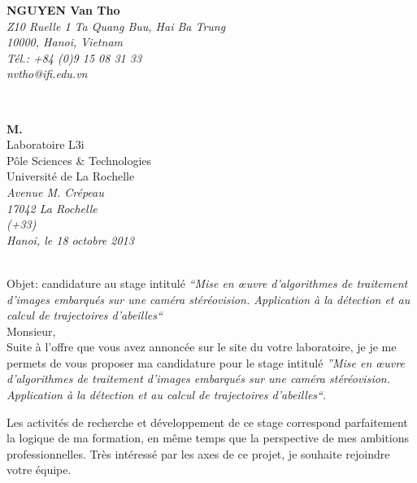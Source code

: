 \documentclass[11pt]{report}
\begin{document}
\sffamily
%
\begin{minipage}[t]{.4\textwidth}
\raggedright
{\bfseries NGUYEN Van Tho}\\[.35ex]
\small\itshape
Z10 Ruelle 1 Ta Quang Buu, Hai Ba Trung \\
10000, Hanoi, Vietnam\\[.35ex]
Tél.: +84 (0)9 15 08 31 33\\
nvtho@ifi.edu.vn\\
\end{minipage}\\[1em]

%

\begin{minipage}[t]{1\textwidth}
	\begin{flushright}
		{\bfseries M. }\\[.35ex]
		Laboratoire L3i\\
		Pôle Sciences \& Technologies\\
		Université de La Rochelle\\
		\small\itshape
		Avenue M. Crépeau\\
		17042 La Rochelle\\
		(+33) \\
		\normalfont Hanoi, le 18 octobre 2013\\
	\end{flushright}
\end{minipage}\\[0.9em]

Objet: candidature au stage intitulé \textit{ ``Mise en œuvre d'algorithmes de traitement 
d'images embarqués sur une caméra stéréovision. Application à la détection et au calcul 
de trajectoires d'abeilles``}\\[1em]
Monsieur,\\[1em] %
Suite à l'offre que vous avez annoncée sur le site du votre laboratoire, je  je me permets 
de vous proposer ma candidature pour le stage intitulé  \textit{ ''Mise en œuvre 
d'algorithmes de traitement d'images embarqués sur une caméra stéréovision. Application à 
la détection et au calcul de trajectoires d'abeilles``}.

Les activités de recherche et développement de ce stage correspond parfaitement la 
logique de ma formation, en même temps que la perspective de mes ambitions 
professionnelles. Très intéressé par les axes de ce projet, je souhaite
rejoindre votre équipe.
\end{document}
